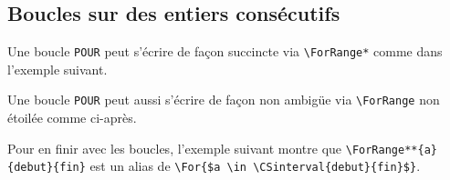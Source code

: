 \documentclass[12pt,a4paper]{article}
\begin{document}

\subsection{Boucles sur des entiers consécutifs}

Une boucle \verb+POUR+ peut s'écrire de façon succincte via \verb+\ForRange*+ comme dans l'exemple suivant.



\vspace{-1em}

Une boucle \verb+POUR+ peut aussi s'écrire de façon non ambigüe via \verb+\ForRange+ non étoilée comme ci-après.




\vspace{-1em}

Pour en finir avec les boucles, l'exemple suivant montre que \verb+\ForRange**{a}{debut}{fin}+ est un alias de \verb+\For{$a \in \CSinterval{debut}{fin}$}+.

\end{document}
